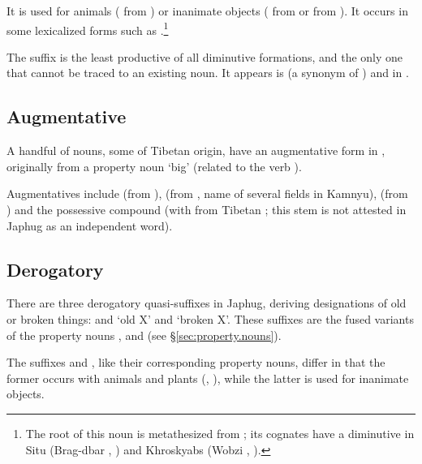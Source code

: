 It is  used for animals ( from ) or inanimate objects ( from  or  from ). It occurs in some lexicalized forms such as .\footnote{The root of this noun is metathesized from ; its cognates have a  diminutive in Situ (Brag-dbar , \citealt[228]{zhang16bragdbar}) and Khroskyabs (Wobzi , \citealt[115]{lai17khroskyabs}).}

The suffix  is the least productive of all diminutive formations, and the only one that cannot be traced to an existing noun. It appears is  (a synonym of ) and in .
 
\subsection{Augmentative} \label{sec:augmentative}
A handful of nouns, some of Tibetan origin, have an augmentative form in , originally from a property noun  `big' (related to the verb ).

Augmentatives include  (from ),  (from , name of several fields in Kamnyu),  (from ) and the possessive compound  (with  from Tibetan ; this stem is not attested in Japhug as an independent word).

\subsection{Derogatory} \label{sec:derogatory}
There are three derogatory quasi-suffixes in Japhug, deriving designations of old or broken things:  and  `old X' and  `broken X'. These suffixes are the fused variants of the property nouns ,  and   (see §\ref{sec:property.nouns}). 

The suffixes  and , like their corresponding property nouns, differ in that the former occurs with animals and plants (, ), while the latter is used for inanimate objects.

